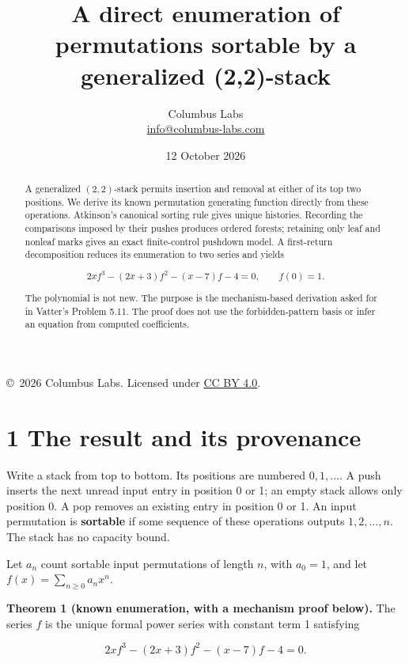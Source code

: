 \documentclass[11pt,letterpaper]{article}
\title{A direct enumeration of permutations sortable by a generalized (2,2)-stack}
\author{Columbus Labs\\\small\href{mailto:info@columbus-labs.com}{info@columbus-labs.com}}
\date{12 October 2026}
\begin{document}
\maketitle
\begin{center}\footnotesize\copyright\ 2026 Columbus Labs. Licensed under \href{https://creativecommons.org/licenses/by/4.0/}{CC BY 4.0}.\end{center}
\vspace{-1em}
\begin{abstract}
A generalized \((2,2)\)-stack permits insertion and removal at either of
its top two positions. We derive its known permutation generating
function directly from these operations. Atkinson's canonical sorting
rule gives unique histories. Recording the comparisons imposed by their
pushes produces ordered forests; retaining only leaf and nonleaf marks
gives an exact finite-control pushdown model. A first-return
decomposition reduces its enumeration to two series and yields

\[2xf^3-(2x+3)f^2-(x-7)f-4=0,\qquad f(0)=1.\]

The polynomial is not new. The purpose is the mechanism-based derivation
asked for in Vatter's Problem 5.11. The proof does not use the
forbidden-pattern basis or infer an equation from computed coefficients.
\end{abstract}

\section{1 The result and its
provenance}\label{the-result-and-its-provenance}

Write a stack from top to bottom. Its positions are numbered
\(0,1,\ldots\). A push inserts the next unread input entry in position 0
or 1; an empty stack allows only position 0. A pop removes an existing
entry in position 0 or 1. An input permutation is \textbf{sortable} if
some sequence of these operations outputs \(1,2,\ldots,n\). The stack
has no capacity bound.

Let \(a_n\) count sortable input permutations of length \(n\), with
\(a_0=1\), and let \(f(x)=\sum_{n\geq0}a_nx^n\).

\textbf{Theorem 1 (known enumeration, with a mechanism proof below).}
The series \(f\) is the unique formal power series with constant term 1
satisfying

\[2xf^3-(2x+3)f^2-(x-7)f-4=0.\]
\end{document}
